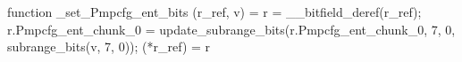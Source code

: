 function _set_Pmpcfg_ent_bits (r_ref, v) = {
    r = __bitfield_deref(r_ref);
    r.Pmpcfg_ent_chunk_0 = update_subrange_bits(r.Pmpcfg_ent_chunk_0, 7, 0, subrange_bits(v, 7, 0));
    (*r_ref) = r
}
